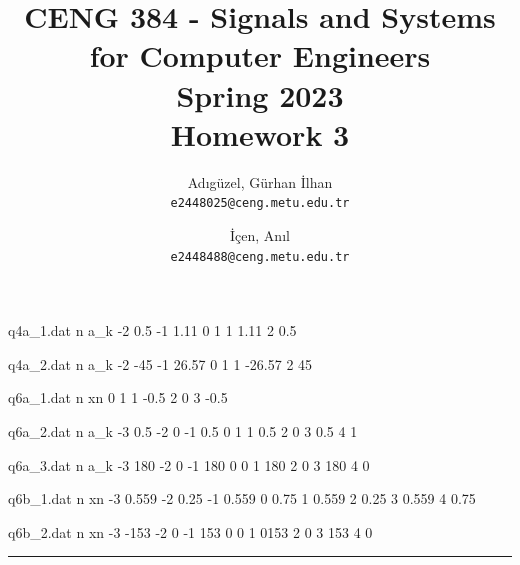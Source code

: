 \documentclass[10pt,a4paper, margin=1in]{article}
\author{
  Adıgüzel, Gürhan İlhan\\
  \texttt{e2448025@ceng.metu.edu.tr}
  \and
  İçen, Anıl\\
  \texttt{e2448488@ceng.metu.edu.tr}
}
\title{CENG 384 - Signals and Systems for Computer Engineers \\
Spring 2023 \\
Homework 3}
\begin{document}
\maketitle

\begin{filecontents}{q4a_1.dat}
 n   a_k
 -2  0.5
 -1  1.11
 0   1
 1   1.11
 2   0.5
\end{filecontents}

\begin{filecontents}{q4a_2.dat}
 n    a_k
 -2   -45
 -1   26.57
 0    1
 1    -26.57
 2    45
\end{filecontents}

\begin{filecontents}{q6a_1.dat}
 n   xn
 0   1
 1  -0.5
 2   0
 3   -0.5
\end{filecontents}

\begin{filecontents}{q6a_2.dat}
 n   a_k
 -3  0.5
 -2  0
 -1  0.5
 0   1
 1   0.5
 2   0
 3   0.5
 4   1
\end{filecontents}

\begin{filecontents}{q6a_3.dat}
 n   a_k
 -3  180
 -2  0
 -1  180
 0   0
 1   180
 2   0
 3   180
 4   0
\end{filecontents}


\begin{filecontents}{q6b_1.dat}
 n   xn
 -3  0.559
 -2  0.25
 -1  0.559
 0   0.75
 1   0.559
 2   0.25
 3   0.559
 4   0.75
\end{filecontents}


\begin{filecontents}{q6b_2.dat}
 n   xn
 -3  -153
 -2  0
 -1  153
 0   0
 1   0153
 2   0
 3   153
 4   0
\end{filecontents}

\noindent\rule{19cm}{1.2pt}
\end{document}
